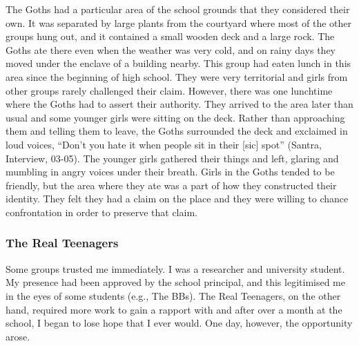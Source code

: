 The Goths had a particular area of the school grounds that they considered their own.  It was separated by large plants from the courtyard where most of the other groups hung out, and it contained a small wooden deck and a large rock.  The Goths ate there even when the weather was very cold, and on rainy days they moved under the enclave of a building nearby.  This group had eaten lunch in this area since the beginning of high school.  They were very territorial and girls from other groups rarely challenged their claim.  However, there was one lunchtime where the Goths had to assert their authority.  They arrived to the area later than usual and some younger girls were sitting on the deck.  Rather than approaching them and telling them to leave, the Goths surrounded the deck and exclaimed in loud voices, ``Don't you hate it when people sit in their [sic] spot'' (Santra, Interview, 03-05).  The younger girls gathered their things and left, glaring and mumbling in angry voices under their breath.  Girls in the Goths tended to be friendly, but the area where they ate was a part of how they constructed their identity.  They felt they had a claim on the place and they were willing to chance confrontation in order to preserve that claim.


\subsubsection{The Real Teenagers}

Some groups trusted me immediately.  I was a researcher and university student. My presence had been approved by the school principal, and this legitimised me in the eyes of some students (e.g., The BBs).  The Real Teenagers, on the other hand, required more work to gain a rapport with and after over a month at the school, I began to lose hope that I ever would.  One day, however, the opportunity arose.

